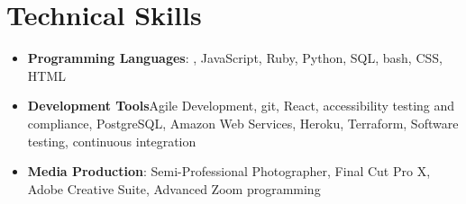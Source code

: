 \section{Technical Skills}

\vspace{6pt}

\begin{itemize}

  \setlength\itemsep{1em}
    \item{\textbf{Programming Languages}: \snap, JavaScript, Ruby, Python, SQL, bash, CSS, HTML}
    
    \item{\textbf{Development Tools}}{Agile Development, git, React, accessibility testing and compliance, PostgreSQL, Amazon Web Services, Heroku, Terraform, Software testing, continuous integration}
    \item{\textbf{Media Production}: Semi-Professional Photographer, Final Cut Pro X, Adobe Creative Suite, Advanced Zoom programming}


\end{itemize}







